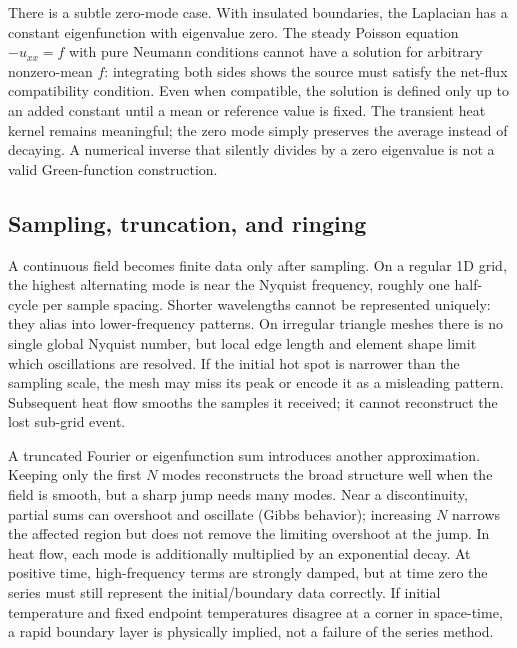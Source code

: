 There is a subtle zero-mode case. With insulated boundaries, the Laplacian has a constant eigenfunction with eigenvalue zero. The steady Poisson equation \(-u_{xx}=f\) with pure Neumann conditions cannot have a solution for arbitrary nonzero-mean \(f\): integrating both sides shows the source must satisfy the net-flux compatibility condition. Even when compatible, the solution is defined only up to an added constant until a mean or reference value is fixed. The transient heat kernel remains meaningful; the zero mode simply preserves the average instead of decaying. A numerical inverse that silently divides by a zero eigenvalue is not a valid Green-function construction.

\subsection{Sampling, truncation, and ringing}\label{04-visual-computing-ii-ch030-sampling-truncation-and-ringing}

\hypertarget{04-visual-computing-ii-ch030-sampling-truncation-and-ringing}{}

A continuous field becomes finite data only after sampling. On a regular 1D grid, the highest alternating mode is near the Nyquist frequency, roughly one half-cycle per sample spacing. Shorter wavelengths cannot be represented uniquely: they alias into lower-frequency patterns. On irregular triangle meshes there is no single global Nyquist number, but local edge length and element shape limit which oscillations are resolved. If the initial hot spot is narrower than the sampling scale, the mesh may miss its peak or encode it as a misleading pattern. Subsequent heat flow smooths the samples it received; it cannot reconstruct the lost sub-grid event.

A truncated Fourier or eigenfunction sum introduces another approximation. Keeping only the first \(N\) modes reconstructs the broad structure well when the field is smooth, but a sharp jump needs many modes. Near a discontinuity, partial sums can overshoot and oscillate (Gibbs behavior); increasing \(N\) narrows the affected region but does not remove the limiting overshoot at the jump. In heat flow, each mode is additionally multiplied by an exponential decay. At positive time, high-frequency terms are strongly damped, but at time zero the series must still represent the initial/boundary data correctly. If initial temperature and fixed endpoint temperatures disagree at a corner in space-time, a rapid boundary layer is physically implied, not a failure of the series method.

